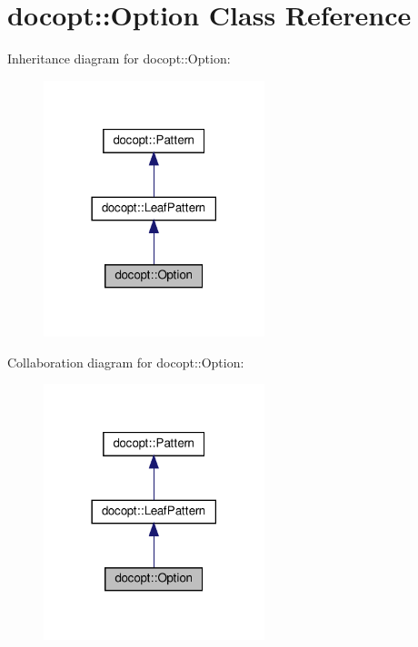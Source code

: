 \hypertarget{classdocopt_1_1Option}{}\section{docopt\+:\+:Option Class Reference}
\label{classdocopt_1_1Option}


Inheritance diagram for docopt\+:\+:Option\+:
\nopagebreak
\begin{figure}[H]
\begin{center}
\leavevmode
\includegraphics[width=182pt]{classdocopt_1_1Option__inherit__graph}
\end{center}
\end{figure}


Collaboration diagram for docopt\+:\+:Option\+:
\nopagebreak
\begin{figure}[H]
\begin{center}
\leavevmode
\includegraphics[width=182pt]{classdocopt_1_1Option__coll__graph}
\end{center}
\end{figure}
